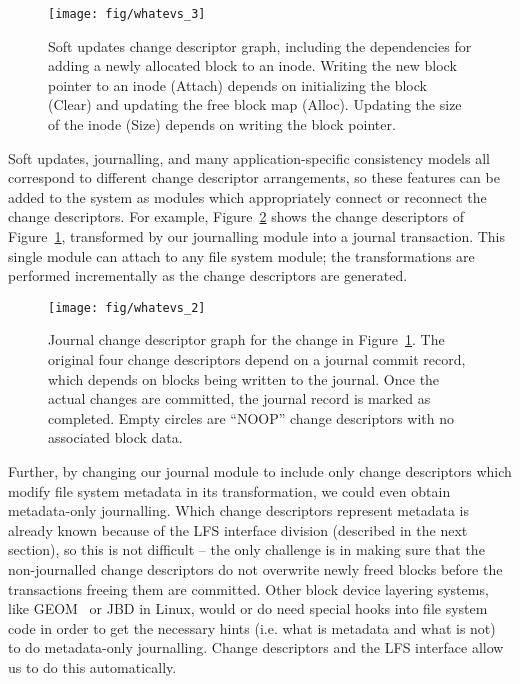 \begin{figure}[b]
  \centering
  \texttt{[image: fig/whatevs\_3]}%
  \caption{\label{fig:softupdates} Soft updates change descriptor graph,
  including the dependencies for adding a newly allocated block to an
  inode. Writing the new block pointer to an inode (Attach) depends on
  initializing the block (Clear) and updating the free block map (Alloc).
  Updating the size of the inode (Size) depends on writing the block
  pointer.}
\end{figure}

Soft updates, journalling, and many application-specific consistency models all
correspond to different change descriptor arrangements, so these features can be
added to the system as modules which appropriately connect or reconnect the
change descriptors. For example, Figure~\ref{fig:journal} shows the change
descriptors of Figure~\ref{fig:softupdates}, transformed by our journalling
module into a journal transaction. This single module can attach to any file
system module; the transformations are performed incrementally as the change
descriptors are generated.

\begin{figure}
  \centering
  \texttt{[image: fig/whatevs\_2]}%
  \caption{\label{fig:journal} Journal change descriptor graph for the
  change in Figure~\ref{fig:softupdates}.  The original four change
  descriptors depend on a journal commit record, which depends on blocks
  being written to the journal.  Once the actual changes are committed, the
  journal record is marked as completed.  Empty circles are ``NOOP'' change
  descriptors with no associated block data.  }
\end{figure}

Further, by changing our journal module to include only change descriptors which
modify file system metadata in its transformation, we could even obtain
metadata-only journalling. Which change descriptors represent metadata is
already known because of the LFS interface division (described in the next
section), so this is not difficult -- the only challenge is in making sure that
the non-journalled change descriptors do not overwrite newly freed blocks before
the transactions freeing them are committed. Other block device layering
systems, like GEOM~\cite{geom} or JBD in Linux, would or do need special hooks
into file system code in order to get the necessary hints (i.e.  what is
metadata and what is not) to do metadata-only journalling. Change descriptors
and the LFS interface allow us to do this automatically.

